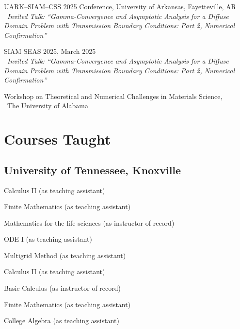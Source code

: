 \documentclass[11pt,letterpaper]{report}
\begin{document}
  \begin{tablist}

    \item[2025] \tab{} UARK--SIAM--CSS 2025 Conference, University of Arkansas, Fayetteville, AR \\
    \, \textit{Invited Talk: ``Gamma-Convergence and Asymptotic Analysis for a Diffuse Domain Problem with Transmission Boundary Conditions: Part 2, Numerical Confirmation''}

    \item[2025] \tab{} SIAM SEAS 2025, March 2025 \\
    \, \textit{Invited Talk: “Gamma-Convergence and Asymptotic Analysis for a Diffuse Domain Problem with Transmission Boundary Conditions: Part 2, Numerical Confirmation”}

    \item[2024] \tab{} Workshop on Theoretical and Numerical Challenges in Materials Science,\\
    \, The University of Alabama



\end{tablist}





    \section*{Courses Taught}

    \subsection*{University of Tennessee, Knoxville}

    \begin{tablist}
        \item[2026] \tab{} Calculus II (as teaching assistant)
        \item[2025] \tab{} Finite Mathematics (as teaching assistant)
        \item[2025] \tab{} Mathematics for the life sciences (as instructor of record)
        \item[2024] \tab{} ODE I (as teaching assistant)
        \item[2024] \tab{} Multigrid Method (as teaching assistant)
        \item[2024] \tab{} Calculus II (as teaching assistant)
        \item[2023] \tab{} Basic Calculus (as instructor of record)
        \item[2023] \tab{} Finite Mathematics (as teaching assistant)
        \item[2022] \tab{} College Algebra (as teaching assistant)


    \end{tablist}
\end{document}
